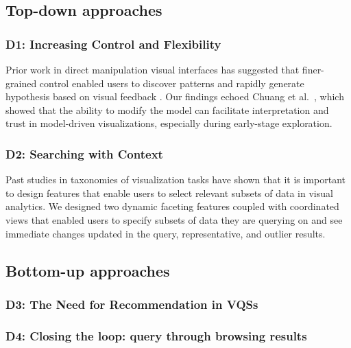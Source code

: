 \subsection{Top-down approaches}
  \subsubsection{D1: Increasing Control and Flexibility}
  Prior work in direct manipulation visual interfaces has suggested that finer-grained control enabled users to discover patterns and rapidly generate hypothesis based on visual feedback \cite{Shneiderman1994,Shneiderman2007a}. Our findings echoed Chuang et al.~\cite{Chuang2012}, which showed that the ability to modify the model can facilitate interpretation and trust in model-driven visualizations, especially during early-stage exploration.
  \subsubsection{D2: Searching with Context}
  Past studies in taxonomies of visualization tasks have shown that it is important to design features that enable users to select relevant subsets of data in visual analytics\cite{Amar2005,Heer2012}. We designed two dynamic faceting features coupled with coordinated views that enabled users to specify subsets of data they are querying on and see immediate changes updated in the query, representative, and outlier results.
\subsection{Bottom-up approaches}
  \subsubsection{D3: The Need for Recommendation in VQSs}
  \subsubsection{D4: Closing the loop: query through browsing results}
